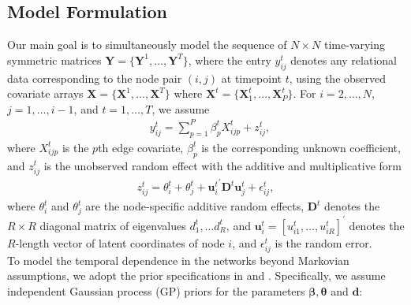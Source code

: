 \documentclass[a4paper]{article}
\begin{document}
\subsection{Model Formulation}\label{subsec: Model formulation}
Our main goal is to simultaneously model the sequence of $N \times N$ time-varying symmetric matrices $\mathbf{Y} = \{\mathbf{Y} ^1,\ldots,\mathbf{Y}^T\}$, where the entry $y^t_{ij}$ denotes any relational data corresponding to the node pair $(i, j)$ at timepoint $t$, using the observed covariate arrays $\mathbf{X} = \{\mathbf{X} ^1,\ldots,\mathbf{X} ^T\}$ where $\mathbf{X} ^t = \{\mathbf{X}^t_1, \ldots, \mathbf{X}^t_P\}$. For $i=2,\ldots,N$,$j=1,\ldots,i-1$, and $t = 1,\ldots,T$, we assume
\begin{equation}
\begin{aligned}
&y^t_{ij}=\sum\limits_{p=1}^P \beta^t_{p}X^t_{ijp}+z^t_{ij},
\end{aligned}
\end{equation}
where $X^t_{ijp}$ is the $p${th} edge covariate, $\beta^t_{p}$ is the corresponding unknown coefficient, and $z^t_{ij}$ is the unobserved random effect with the additive and multiplicative form
\begin{equation}
\begin{aligned}
z^t_{ij} = \theta^t_{i}+\theta^t_{j}+{{\boldsymbol{u}^t_{i}}^\prime \mathbf{D}^{t} \boldsymbol{u}^t_{j}}+\epsilon^t_{ij},
\end{aligned}
\end{equation}
where $\theta^t_{i}$ and $\theta^t_{j}$ are the node-specific additive random effects, $\mathbf{D}^{t}$ denotes the $R\times R$ diagonal matrix of eigenvalues $d^t_1,\ldots d^t_R$, and $\boldsymbol{u}^t_{i}=[u^t_{i1},\ldots,u^t_{iR}]^\prime$ denotes the $R$-length vector of latent coordinates of node $i$, and $\epsilon^t_{ij}$ is the random error.\\ \newline
To model the temporal dependence in the networks beyond Markovian assumptions, we adopt the prior specifications in \cite{bhattacharya2011sparse} and \cite{durante2013nonparametric}. Specifically, we assume independent Gaussian process (GP) priors for the parameters $\boldsymbol{\beta}, \boldsymbol{\theta}$ and  $\boldsymbol{d}$: 
\end{document}
